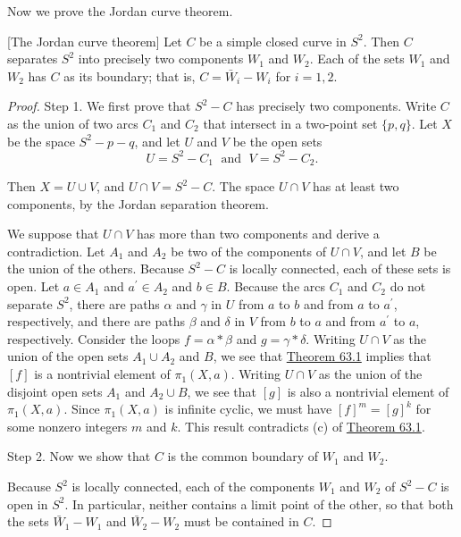 Now we prove the Jordan curve theorem.

\begin{theorem}
\label{thm:\thetheorem}[The Jordan curve theorem]
Let \(C\) be a simple closed curve in \(S^{2}\). Then \(C\) separates \(S^{2}\) into precisely two components \(W_{1}\) and \(W_{2}\). Each of the sets \(W_{1}\) and \(W_{2}\) has \(C\) as its boundary; that is, \(C = \bar{W}_{i} - W_{i}\) for \(i = 1, 2\).
\end{theorem}

\begin{proof}
Step 1. We first prove that \(S^{2} - C\) has precisely two components. Write \(C\) as the union of two arcs \(C_{1}\) and \(C_{2}\) that intersect in a two-point set \(\{ p,q\}\). Let \(X\) be the space \(S^{2} - p - q\), and let \(U\) and \(V\) be the open sets
\[
U = S^{2} - C_{1}\;\text{ and }\;V = S^{2} - C_{2}.
\]

Then \(X = U \cup V\), and \(U \cap V = S^{2} - C\). The space \(U \cap V\) has at least two components, by the Jordan separation theorem.

We suppose that \(U \cap V\) has more than two components and derive a contradiction. Let \(A_{1}\) and \(A_{2}\) be two of the components of \(U \cap V\), and let \(B\) be the union of the others. Because \(S^{2} - C\) is locally connected, each of these sets is open. Let \(a \in {A}_{1}\) and \(a^{\prime } \in {A}_{2}\) and \(b \in B\). Because the arcs \(C_{1}\) and \(C_{2}\) do not separate \(S^{2}\), there are paths \(\alpha\) and \(\gamma\) in \(U\) from \(a\) to \(b\) and from \(a\) to \(a^{\prime }\), respectively, and there are paths \(\beta\) and \(\delta\) in \(V\) from \(b\) to \(a\) and from \(a^{\prime }\) to \(a\), respectively. Consider the loops \(f = \alpha * \beta\) and \(g = \gamma * \delta\). Writing \(U \cap V\) as the union of the open sets \(A_{1} \cup {A}_{2}\) and \(B\), we see that \hyperref[thm:63.1]{Theorem 63.1} implies that \([ f]\) is a nontrivial element of \({\pi }_{1}( {X,a})\). Writing \(U \cap V\) as the union of the disjoint open sets \(A_{1}\) and \(A_{2} \cup B\), we see that \([ g]\) is also a nontrivial element of \({\pi }_{1}( {X,a})\). Since \({\pi }_{1}( {X,a})\) is infinite cyclic, we must have \({[ f] }^{m} = {[ g] }^{k}\) for some nonzero integers \(m\) and \(k\). This result contradicts (c) of \hyperref[thm:63.1]{Theorem 63.1}.

Step 2. Now we show that \(C\) is the common boundary of \(W_{1}\) and \(W_{2}\).

Because \(S^{2}\) is locally connected, each of the components \(W_{1}\) and \(W_{2}\) of \(S^{2} - C\) is open in \(S^{2}\). In particular, neither contains a limit point of the other, so that both the sets \(\bar{W}_{1} - W_{1}\) and \(\bar{W}_{2} - W_{2}\) must be contained in \(C\).


\end{proof}
